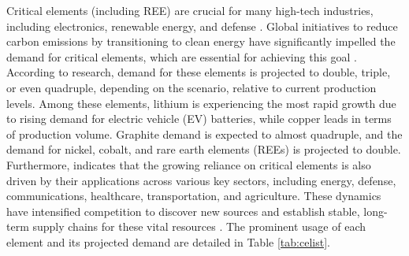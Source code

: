 \documentclass[11pt,a4paper,]{article}
\begin{document}
Critical elements (including REE) are crucial for many high-tech industries, including electronics, renewable energy, and defense \autocite{Huang2018}. Global initiatives to reduce carbon emissions by transitioning to clean energy have significantly impelled the demand for critical elements, which are essential for achieving this goal \autocite{IEA2021,Wang2022}. According to \textcite{IEA2024} research, demand for these elements is projected to double, triple, or even quadruple, depending on the scenario, relative to current production levels. Among these elements, lithium is experiencing the most rapid growth due to rising demand for electric vehicle (EV) batteries, while copper leads in terms of production volume. Graphite demand is expected to almost quadruple, and the demand for nickel, cobalt, and rare earth elements (REEs) is projected to double. Furthermore, \textcite{Fortier2018} indicates that the growing reliance on critical elements is also driven by their applications across various key sectors, including energy, defense, communications, healthcare, transportation, and agriculture. These dynamics have intensified competition to discover new sources and establish stable, long-term supply chains for these vital resources \autocite{Emsbo2021}. The prominent usage of each element and its projected demand are detailed in Table \ref{tab:celist}.
\end{document}
